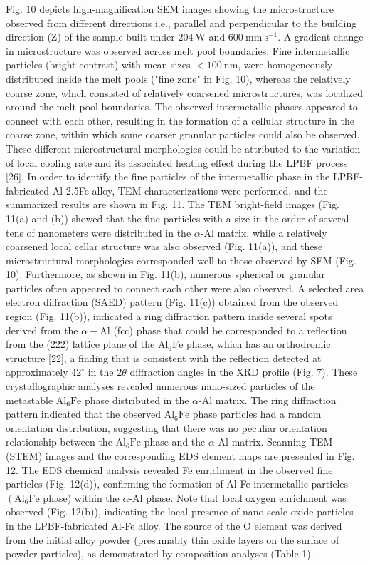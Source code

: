 \documentclass[10pt]{article}
\begin{document}
Fig. 10 depicts high-magnification SEM images showing the microstructure observed from different directions i.e., parallel and perpendicular to the building direction (Z) of the sample built under $204 \mathrm{~W}$ and $600 \mathrm{~mm} \mathrm{~s}^{-1}$. A gradient change in microstructure was observed across melt pool boundaries. Fine intermetallic particles (bright contrast) with mean sizes $<100 \mathrm{~nm}$, were homogeneously distributed inside the melt pools ("fine zone" in Fig. 10), whereas the relatively coarse zone, which consisted of relatively coarsened microstructures, was localized around the melt pool boundaries. The observed intermetallic phases appeared to connect with each other, resulting in the formation of a cellular structure in the coarse zone, within which some coarser granular particles could also be observed. These different microstructural morphologies could be attributed to the variation of local cooling rate and its associated heating effect during the LPBF process [26]. In order to identify the fine particles of the intermetallic phase in the LPBF-fabricated Al-2.5Fe alloy, TEM characterizations were performed, and the summarized results are shown in Fig. 11. The TEM bright-field images (Fig. 11(a) and (b)) showed that the fine particles with a size in the order of several tens of nanometers were distributed in the $\alpha$-Al matrix, while a relatively coarsened local cellar structure was also observed (Fig. 11(a)), and these microstructural morphologies corresponded well to those observed by SEM (Fig. 10). Furthermore, as shown in Fig. 11(b), numerous spherical or granular particles often appeared to connect each other were also observed. A selected area electron diffraction (SAED) pattern (Fig. 11(c)) obtained from the observed region (Fig. 11(b)), indicated a ring diffraction pattern inside several spots derived from the $\alpha-\mathrm{Al}$ (fcc) phase that could be corresponded to a reflection from the (222) lattice plane of the $\mathrm{Al}_{6} \mathrm{Fe}$ phase, which has an orthodromic structure [22], a finding that is consistent with the reflection detected at approximately $42^{\circ}$ in the $2 \theta$ diffraction angles in the XRD profile (Fig. 7). These crystallographic analyses revealed numerous nano-sized particles of the metastable $\mathrm{Al}_{6} \mathrm{Fe}$ phase distributed in the $\alpha$-Al matrix. The ring diffraction pattern indicated that the observed $\mathrm{Al}_{6} \mathrm{Fe}$ phase particles had a random orientation distribution, suggesting that there was no peculiar orientation relationship between the $\mathrm{Al}_{6} \mathrm{Fe}$ phase and the $\alpha$-Al matrix. Scanning-TEM (STEM) images and the corresponding EDS element maps are presented in Fig. 12. The EDS chemical analysis revealed Fe enrichment in the observed fine particles (Fig. 12(d)), confirming the formation of Al-Fe intermetallic particles $\left(\mathrm{Al}_{6} \mathrm{Fe}\right.$ phase) within the $\alpha$-Al phase. Note that local oxygen enrichment was observed (Fig. 12(b)), indicating the local presence of nano-scale oxide particles in the LPBF-fabricated Al-Fe alloy. The source of the $\mathrm{O}$ element was derived from the initial alloy powder (presumably thin oxide layers on the surface of powder particles), as demonstrated by composition analyses (Table 1).\\
\end{document}
